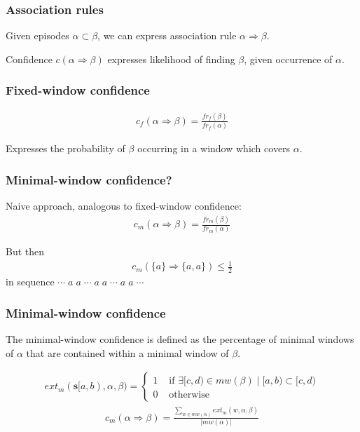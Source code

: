 \documentclass[dvipsnames]{beamer}
\begin{document}
\begin{frame}
\frametitle{Association rules}

Given episodes $ \alpha \subset \beta $, we can express association rule $ \alpha \Rightarrow \beta $.
\par\bigskip
Confidence $ c(\alpha \Rightarrow \beta) $ expresses likelihood of finding $ \beta $, given occurrence of $ \alpha $.

\end{frame}
\begin{frame}
\frametitle{Fixed-window confidence}

\begin{align*}
c_f(\alpha \Rightarrow \beta) = \frac{ fr_f(\beta) }{ fr_f(\alpha) }
\end{align*}

Expresses the probability of $ \beta $ occurring in a window which covers $ \alpha $.

\end{frame}
\begin{frame}
\frametitle{Minimal-window confidence?}

Naive approach, analogous to fixed-window confidence:
\begin{align*}
c_m(\alpha \Rightarrow \beta) = \frac{fr_m(\beta)}{fr_m(\alpha)}
\end{align*}
\pause
\par\bigskip
But then\begin{align*}c_m(\{ a \} \Rightarrow \{ a, a \}) \leq \frac12 \end{align*} in sequence $ \cdots\;a\;a\;\cdots\;a\;a\;\cdots\;a\;a\;\cdots $



\end{frame}
\begin{frame}
\frametitle{Minimal-window confidence}

The minimal-window confidence is defined as the percentage of minimal windows of $ \alpha $ that are contained within a minimal window of $ \beta $.

\begin{align*}
ext_m(\boldsymbol{s}[a, b), \alpha, \beta) =
\begin{cases}
    1 & \text{ if } \exists [c, d) \in mw(\beta) \mid [a, b) \subset [c, d) \\
    0 & \text{ otherwise}
\end{cases}
\end{align*}
\begin{align*}
c_m(\alpha \Rightarrow \beta) = \frac{\sum_{w \in mw(\alpha)} ext_m(w, \alpha, \beta)}{| mw(\alpha) |}
\end{align*}

\end{frame}
\end{document}
